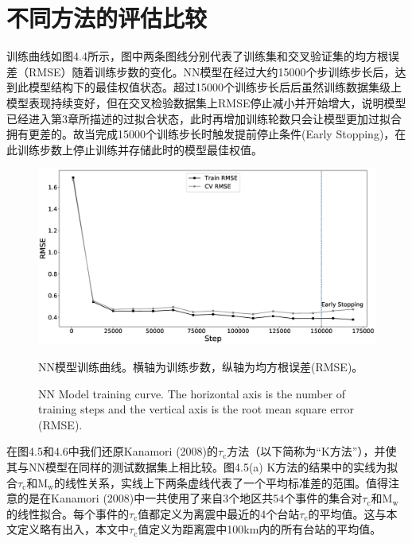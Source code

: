 \section{不同方法的评估比较}
\indent 训练曲线如图4.4所示，图中两条图线分别代表了训练集和交叉验证集的均方根误差（RMSE）随着训练步数的变化。NN模型在经过大约15000个步训练步长后，达到此模型结构下的最佳权值状态。超过15000个训练步长后后虽然训练数据集级上模型表现持续变好，但在交叉检验数据集上RMSE停止减小并开始增大，说明模型已经进入第3章所描述的过拟合状态，此时再增加训练轮数只会让模型更加过拟合拥有更差的。故当完成15000个训练步长时触发提前停止条件(Early Stopping)，在此训练步数上停止训练并存储此时的模型最佳权值。\\
\begin{figure}[!h] 
\centering 
 \includegraphics[width=0.9\linewidth]{img/6.eps} 
 \renewcommand{\figurename}{图} 
\caption{NN模型训练曲线。横轴为训练步数，纵轴为均方根误差(RMSE)。} 
\addtocounter{figure}{-1} \vspace{-5pt} 
\renewcommand{\figurename}{Fig} 
\caption{NN Model training curve. The horizontal axis is the number of training steps and the vertical axis is the root mean square error (RMSE).} 
\renewcommand{\figurename}{图} 
\label{fig:network-device-influence.png} 
\end{figure}
\indent 在图4.5和4.6中我们还原Kanamori (2008)的$\tau_{\mathrm{c}}$方法（以下简称为“K方法”），并使其与NN模型在同样的测试数据集上相比较。图4.5(a) K方法的结果中的实线为拟合$\tau_{\mathrm{c}}$和$\mathrm{M}_{\mathrm{w}}$的线性关系，实线上下两条虚线代表了一个平均标准差的范围。值得注意的是在Kanamori (2008)中一共使用了来自3个地区共54个事件的集合对$\tau_{\mathrm{c}}$和$\mathrm{M}_{\mathrm{w}}$的线性拟合。每个事件的$\tau_{\mathrm{c}}$值都定义为离震中最近的4个台站$\tau_{\mathrm{c}}$的平均值。这与本文定义略有出入，本文中$\tau_{\mathrm{c}}$值定义为距离震中100km内的所有台站的平均值。\\
